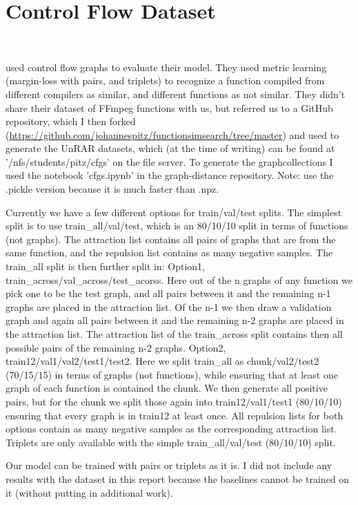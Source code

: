 \section{Control Flow Dataset}\

\cite{li2019} used control flow graphs to evaluate their model. They used metric learning (margin-loss with pairs, and triplets) to recognize a function compiled from different compilers as similar, and different functions as not similar. They didn't share their dataset of FFmpeg functions with us, but referred us to a GitHub repository, which I then forked (\url{https://github.com/johannespitz/functionsimsearch/tree/master}) and used to generate the UnRAR datasets, which (at the time of writing) can be found at '/nfs/students/pitz/cfgs' on the file server. To generate the graphcollections I used the notebook 'cfgs.ipynb' in the graph-distance repository. Note: use the .pickle version because it is much faster than .npz.

Currently we have a few different options for train/val/test splits. The simplest split is to use train\_all/val/test, which is an 80/10/10 split in terms of functions (not graphs). The attraction list contains all pairs of graphs that are from the same function, and the repulsion list contains as many negative samples. The train\_all split is then further split in: Option1, train\_across/val\_across/test\_acorss. Here out of the n graphs of any function we pick one to be the test graph, and all pairs between it and the remaining n-1 graphs are placed in the attraction list. Of the n-1 we then draw a validation graph and again all pairs between it and the remaining n-2 graphs are placed in the attraction list. The attraction list of the train\_across split contains then all possible pairs of the remaining n-2 graphs. Option2, train12/val1/val2/test1/test2. Here we split train\_all as chunk/val2/test2 (70/15/15) in terms of graphs (not functions), while ensuring that at least one graph of each function is contained the chunk. We then generate all positive pairs, but for the chunk we split those again into train12/val1/test1 (80/10/10) ensuring that every graph is in train12 at least once. All repulsion lists for both options contain as many negative samples as the corresponding attraction list. Triplets are only available with the simple  train\_all/val/test (80/10/10) split.

Our model can be trained with pairs or triplets as it is. I did not include any results with the dataset in this report because the baselines cannot be trained on it (without putting in additional work).


